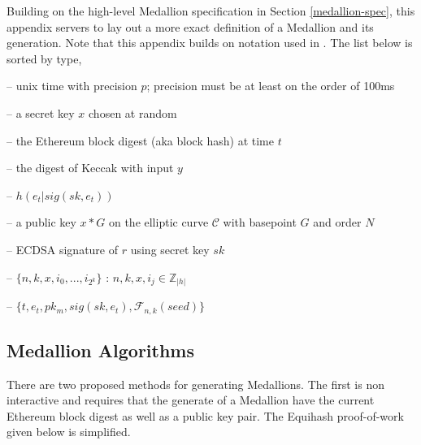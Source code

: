 
Building on the high-level Medallion specification in Section \ref{medallion-spec}, this appendix servers to lay out a more exact definition of a Medallion and its generation. Note that this appendix builds on notation used in \cite{Equihash}. The list below is sorted by type,
\begin{description}[align=right, labelwidth=2.7cm]
	\item[$t$ (uint)] -- unix time with precision $p$; precision must be at least on the order of 100ms
	\item[$sk_m$ (uint)]  -- a secret key $x$ chosen at random
    \item[$e_t$ (uint)]  -- the Ethereum block digest (aka block hash) at time $t$ 
    \item[$h(y)$ (uint)]  -- the digest of Keccak with input $y$
    \item[$seed$ (uint)]  -- $h(e_t|sig(sk,e_t))$
    \item[$pk_m$ (tuple)]  -- a public key $x*G$ on the elliptic curve $\mathcal{C}$ with basepoint $G$ and order $N$
    \item[$sig(sk, r)$ (tuple)]  -- ECDSA signature of $r$ using secret key $sk$
    \item[$\mathcal{F}_{n,k}(x)$ (struct)] -- $\{n, k, x, i_0, ..., i_{2^{k}} \}$ : $n,k,x,i_j \in\mathbb{Z}_{|h|}$
	\item[$\mathcal{M}$ (struct)] -- $\{t, e_t, pk_m, sig(sk,e_t), \mathcal{F}_{n,k}(seed)\}$
\end{description}

\subsection*{Medallion Algorithms}

There are two proposed methods for generating Medallions. The first is non interactive and requires that the generate of a Medallion have the current Ethereum block digest as well as a public key pair. The Equihash proof-of-work given below is simplified.

